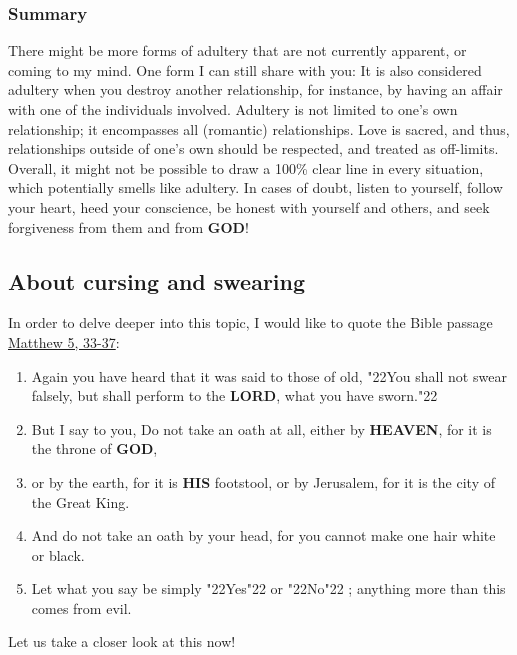 \documentclass[12pt,a5paper]{article}
\newcommand{\God}[0]{\textbf{GOD}}
\newcommand{\Heaven}[0]{\textbf{HEAVEN}}
\newcommand{\His}[0]{\textbf{HIS}}
\newcommand{\Lord}[0]{\textbf{LORD}}
\newcommand{\q}[1]{\char"22{#1}\char"22 }
\begin{document}
	\subsubsection{Summary}
		There might be more forms of adultery that are not currently apparent,
		or coming to my mind.
		One form I can still share with you:
		It is also considered adultery when you destroy another relationship,
		for instance,
		by having an affair with one of the individuals involved.
		Adultery is not limited to one's own relationship;
		it encompasses all (romantic) relationships.
		Love is sacred,
		and thus,
		relationships outside of one's own should be respected,
		and treated as off-limits.
		\\
		Overall,
		it might not be possible to draw a 100\% clear line in every situation,
		which potentially smells like adultery.
		In cases of doubt,
		listen to yourself,
		follow your heart,
		heed your conscience,
		be honest with yourself and others,
		and seek forgiveness from them and from {\God}!

	\subsection{About cursing and swearing}
		In order to delve deeper into this topic,
		I would like to quote the Bible passage \href{https://www.die-bibel.de/bibeln/online-bibeln/lesen/ESV/MAT.5/Matthew-5}{Matthew 5, 33-37}:
		\begin{enumerate}[noitemsep,start=33]
			\item	Again you have heard that it was said to those of old,
					\q{You shall not swear falsely,
					but shall perform to the {\Lord},
					what you have sworn.}
			\item	But I say to you,
					Do not take an oath at all,
					either by {\Heaven},
					for it is the throne of {\God},
			\item	or by the earth,
					for it is {\His} footstool,
					or by Jerusalem,
					for it is the city of the Great King.
			\item	And do not take an oath by your head,
					for you cannot make one hair white or black.
			\item	Let what you say be simply \q{Yes} or \q{No};
					anything more than this comes from evil.
		\end{enumerate}
		Let us take a closer look at this now!
\end{document}
